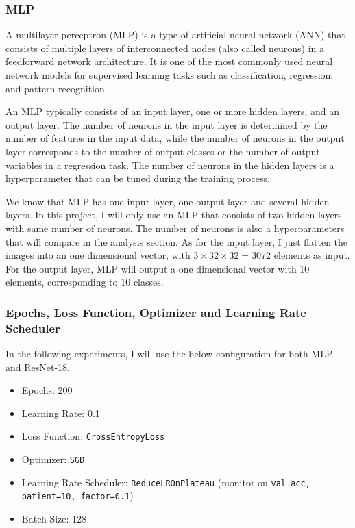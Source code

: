 \documentclass[twocolumn, draft]{extarticle}
\begin{document}
\subsubsection{MLP}

A multilayer perceptron (MLP) is a type of artificial neural network (ANN) that consists of multiple layers of interconnected nodes (also called neurons) in a feedforward network architecture. It is one of the most commonly used neural network models for supervised learning tasks such as classification, regression, and pattern recognition.


An MLP typically consists of an input layer, one or more hidden layers, and an output layer. The number of neurons in the input layer is determined by the number of features in the input data, while the number of neurons in the output layer corresponds to the number of output classes or the number of output variables in a regression task. The number of neurons in the hidden layers is a hyperparameter that can be tuned during the training process.

We know that MLP has one input layer, one output layer and several hidden layers. In this project, I will only use an MLP that consists of two hidden layers with same number of neurons. The number of neurons is also a hyperparameters that will compare in the analysis section. As for the input layer, I just flatten the images into an one dimensional vector, with $3 \times 32 \times 32 = 3072$ elements as input. For the output layer, MLP will output a one dimensional vector with 10 elements, corresponding to 10 classes.

\subsubsection{Epochs, Loss Function, Optimizer and Learning Rate Scheduler}

In the following experiments, I will use the below configuration for both MLP and ResNet-18. 

\begin{itemize}
\item Epochs: 200
\item Learning Rate: 0.1
\item Loss Function: \texttt{CrossEntropyLoss}
\item Optimizer: \texttt{SGD}
\item Learning Rate Scheduler: \texttt{ReduceLROnPlateau} (monitor on \texttt{val\_acc, patient=10, factor=0.1})
\item Batch Size: 128
\end{itemize}
\end{document}
